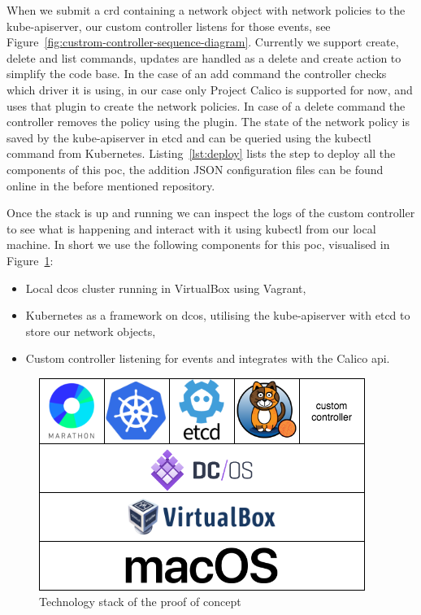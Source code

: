 When we submit a \gls{crd} containing a network object with network policies to the kube-apiserver, our custom controller listens for those events, see Figure~\ref{fig:custrom-controller-sequence-diagram}. Currently we support create, delete and list commands, updates are handled as a delete and create action to simplify the code base. In the case of an add command the controller checks which driver it is using, in our case only Project Calico is supported for now, and uses that plugin to create the network policies. In case of a delete command the controller removes the policy using the plugin. The state of the network policy is saved by the kube-apiserver in etcd and can be queried using the kubectl command from Kubernetes. Listing~\ref{lst:deploy} lists the step to deploy all the components of this \gls{poc}, the addition JSON configuration files can be found online in the before mentioned repository. 

Once the stack is up and running we can inspect the logs of the custom controller to see what is happening and interact with it using kubectl from our local machine. In short we use the following components for this \gls{poc}, visualised in Figure~\ref{fig:poc-stack}:
\begin{itemize}
    \item Local \gls{dcos} cluster running in VirtualBox\cite{virtualbox} using Vagrant\cite{vagrant},
    \item Kubernetes as a framework on \gls{dcos}, utilising the kube-apiserver with etcd to store our network objects,
    \item Custom controller listening for events and integrates with the Calico \gls{api}.
\end{itemize}

\begin{figure}
    \centering
    \includegraphics[width=0.6\columnwidth]{images/poc-stack}
    \caption{Technology stack of the proof of concept}
    \label{fig:poc-stack}
\end{figure}
